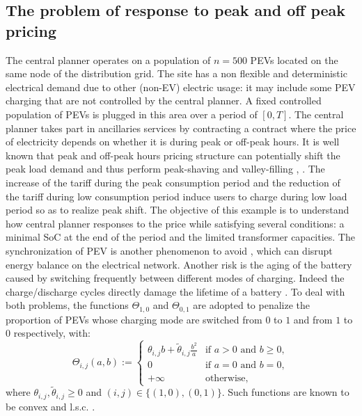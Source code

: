 \documentclass[conference]{IEEEtran}
\begin{document}
\subsection{The problem of response to peak and off peak pricing}\label{case 0}
The central planner operates on a population of $n=500$ PEVs located on the same node of the distribution grid. The site has a non flexible and deterministic electrical demand due to other (non-EV) electric usage: it may include some PEV charging that are not controlled by the central planner. A fixed controlled population of PEVs is plugged in this area over a period of $[0,T]$. The central planner takes part in ancillaries services by contracting a contract where the price of electricity depends on whether it is during  peak or off-peak hours. 
It is well known that peak and off-peak hours pricing  structure  can  potentially  shift  the peak load demand and thus perform peak-shaving and valley-filling  \cite{dubey2015determining}, \cite{dubey2015electric}. The increase of the tariff during the peak consumption period and the reduction of the tariff during low consumption period
induce users to charge during low load period so as to realize peak shift. The objective of this example is to understand how central planner responses to the price while satisfying several conditions: a minimal SoC at the end of the period and the limited transformer capacities.
The  synchronization of PEV is another phenomenon to avoid \cite{turitsyn2010robust}, which can disrupt energy balance on the electrical network. Another risk is the aging of the battery caused by  switching frequently between different modes of charging. Indeed the charge/discharge cycles directly damage the lifetime of a battery \cite{abronzini2019cost}. To deal with both problems, the functions $\Theta_{1,0}$ and $\Theta_{0,1}$ are adopted to penalize the proportion of PEVs whose charging mode are switched from $0$ to $1$ and from $1$ to $0$ respectively, with:
\begin{equation}
 \label{def_theta01}
\Theta_{i,j}(a,b):=
\left\{
\begin{array}{ll}
 \theta_{i,j}b+ \tilde{\theta}_{i,j}\frac{b^2}{a} & \mbox{if }a>0\mbox{ and }b\geq 0, \\
 0 & \mbox{if }a=0 \mbox{ and }b=0, \\
 +\infty&\mbox{otherwise},
\end{array}\right.
\end{equation}
where $\theta_{i,j},\tilde{\theta}_{i,j}\geq 0$ and $(i,j)\in\{(1,0),(0,1)\}$. Such functions are known to be convex and l.s.c. \cite{benamou2000computational}.
\end{document}
